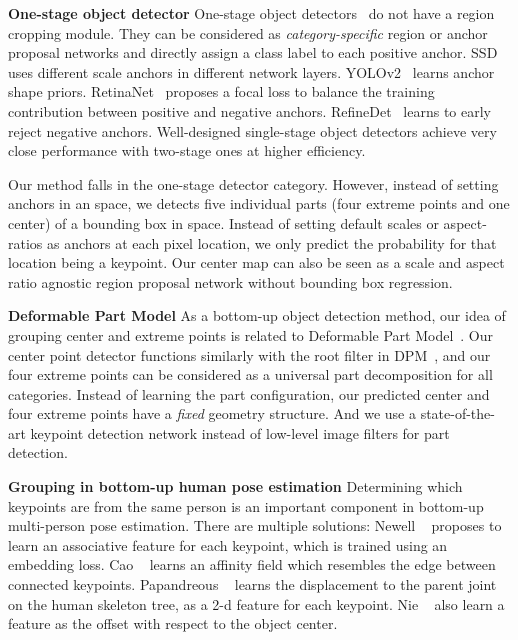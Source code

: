 \documentclass[10pt,twocolumn,letterpaper]{article}
\begin{document}
\textbf{One-stage object detector}
One-stage object detectors~\cite{lin2018focal,redmon2016you,liu2016ssd,redmon2017yolo9000,Law_2018_ECCV,wang2017point,shen2017dsod} do not have a region cropping module. 
They can be considered as \emph{category-specific} region or anchor proposal networks and directly assign a class label to each positive anchor. 
SSD~\cite{liu2016ssd,fu2017dssd} uses different scale anchors in different network layers. 
YOLOv2~\cite{redmon2017yolo9000} learns anchor shape priors.
RetinaNet~\cite{lin2018focal} proposes a focal loss to balance the training contribution between positive and negative anchors. 
RefineDet~\cite{zhang2018single} learns to early reject negative anchors.
Well-designed single-stage object detectors achieve very close performance with two-stage ones at higher efficiency. 

Our method falls in the one-stage detector category. 
However, instead of setting anchors in an  space, we detects five individual parts (four extreme points and one center) of a bounding box in  space. 
Instead of setting default scales or aspect-ratios as anchors at each pixel location, we only predict the probability for that location being a keypoint. 
Our center map can also be seen as a scale and aspect ratio agnostic region proposal network without bounding box regression. 

\textbf{Deformable Part Model}
As a bottom-up object detection method, our idea of grouping center and extreme points is related to Deformable Part Model~\cite{felzenszwalb2010object}. 
Our center point detector functions similarly with the root filter in DPM~\cite{felzenszwalb2010object}, and our
four extreme points can be considered as a universal part decomposition for all categories. 
Instead of learning the part configuration, our predicted center and four extreme points have a \emph{fixed} geometry structure.
And we use a state-of-the-art keypoint detection network instead of low-level image filters for part detection. 

\textbf{Grouping in bottom-up human pose estimation}
Determining which keypoints are from the same person is an important component in bottom-up multi-person pose estimation.
There are multiple solutions:
Newell \etal ~\cite{newell2017associative} proposes to learn an associative feature for each keypoint, which is trained using an embedding loss.
Cao \etal ~\cite{cao2017realtime} learns an affinity field which resembles the edge between connected keypoints.
Papandreous \etal ~\cite{papandreou2018personlab} learns the displacement to the parent joint on the human skeleton tree, as a 2-d feature for each keypoint. 
Nie \etal ~\cite{nie2018ppn} also learn a feature as the offset with respect to the object center. 
\end{document}
